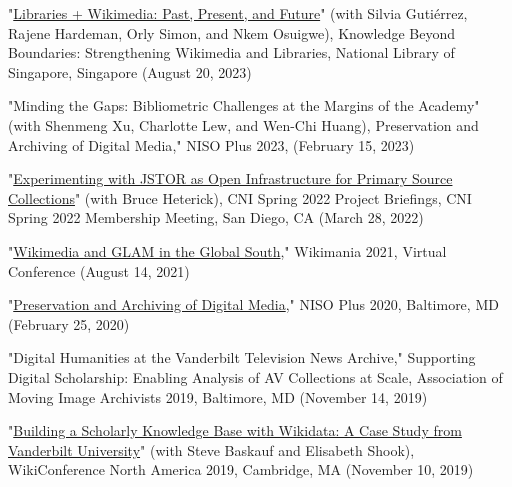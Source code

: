 \documentclass[]{res} %
\begin{document}
\begin{resume}
\begin{hangparas}{.25in}{1}"\href{https://wikimania.wikimedia.org/wiki/2023:Related_events/Knowledge_Beyond_Boundaries}{Libraries + Wikimedia: Past, Present, and Future}" (with Silvia Gutiérrez, Rajene Hardeman, Orly Simon, and Nkem Osuigwe), Knowledge Beyond Boundaries: Strengthening Wikimedia and Libraries, National Library of Singapore, Singapore (August 20, 2023)\end{hangparas}

\begin{hangparas}{.25in}{1}"Minding the Gaps: Bibliometric Challenges at the Margins of the Academy" (with Shenmeng Xu, Charlotte Lew, and Wen-Chi Huang), {Preservation and Archiving of Digital Media}," NISO Plus 2023, (February 15, 2023)\end{hangparas}

\begin{hangparas}{.25in}{1}"\href{https://www.cni.org/topics/special-collections/experimenting-with-jstor}{Experimenting with JSTOR as Open Infrastructure for Primary Source Collections}" (with Bruce Heterick), CNI Spring 2022 Project Briefings, CNI Spring 2022 Membership Meeting, San Diego, CA (March 28, 2022)\end{hangparas}

\begin{hangparas}{.25in}{1}"\href{https://wikimania.wikimedia.org/wiki/2021:Submissions/Wikimedia_and_GLAM_in_the_Global_South}{Wikimedia and GLAM in the Global South}," Wikimania 2021, Virtual Conference (August 14, 2021)\end{hangparas}

\begin{hangparas}{.25in}{1}"\href{https://nisoplus20.sched.com/event/YiQG/preservation-and-archiving-of-digital-media}{Preservation and Archiving of Digital Media}," NISO Plus 2020, Baltimore, MD (February 25, 2020)\end{hangparas}

\begin{hangparas}{.25in}{1}"Digital Humanities at the Vanderbilt Television News Archive," Supporting Digital Scholarship: Enabling Analysis of AV Collections at Scale, Association of Moving Image Archivists 2019, Baltimore, MD (November 14, 2019)\end{hangparas}

\begin{hangparas}{.25in}{1}"\href{https://wikiconference.org/wiki/Submissions:2019/Building_a_Scholarly_Knowledge_Base_with_Wikidata:_A_Case_Study_from_Vanderbilt_University}{Building a Scholarly Knowledge Base with Wikidata: A Case Study from Vanderbilt University}" (with Steve Baskauf and Elisabeth Shook), WikiConference North America 2019, Cambridge, MA (November 10, 2019)\end{hangparas}


\end{resume}
\end{document}

